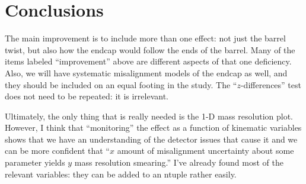\documentclass[12pt]{article}
\begin{document}
\section{Conclusions}

The main improvement is to include more than one effect: not just the
barrel twist, but also how the endcap would follow the ends of the
barrel.  Many of the items labeled ``improvement'' above are different
aspects of that one deficiency.  Also, we will have systematic
misalignment models of the endcap as well, and they should be included
on an equal footing in the study.  The ``$z$-differences'' test does
not need to be repeated: it is irrelevant.

Ultimately, the only thing that is really needed is the 1-D mass
resolution plot.  However, I think that ``monitoring'' the effect as a
function of kinematic variables shows that we have an understanding of
the detector issues that cause it and we can be more confident that
``$x$ amount of misalignment uncertainty about some parameter yields
$y$ mass resolution smearing.''  I've already found most of the
relevant variables: they can be added to an ntuple rather easily.
\end{document}
